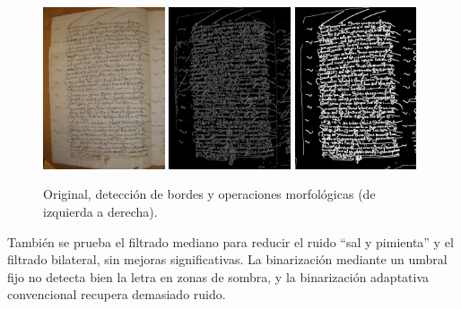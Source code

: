 \documentclass[11pt,a4paper]{article}
\begin{document}
\begin{figure}[H] 
\centering 
\begin{minipage}{1.0\textwidth} 
\includegraphics[width=0.32\textwidth]{CODEA-0205_2v.jpg} 
\includegraphics[width=0.32\textwidth]{canny_image_aftergauss_eq2.png} 
\includegraphics[width=0.32\textwidth]{photo_2025-01-27_21-34-01.jpg} 
\caption{Original, detección de bordes y operaciones morfológicas (de izquierda a derecha).} 
\label{fig:tresfotos} 
\end{minipage} 
\end{figure}

También se prueba el filtrado mediano para reducir el ruido “sal y pimienta” y el filtrado bilateral, sin mejoras significativas. La binarización mediante un umbral fijo no detecta bien la letra en zonas de sombra, y la binarización adaptativa convencional recupera demasiado ruido.\\
\end{document}
